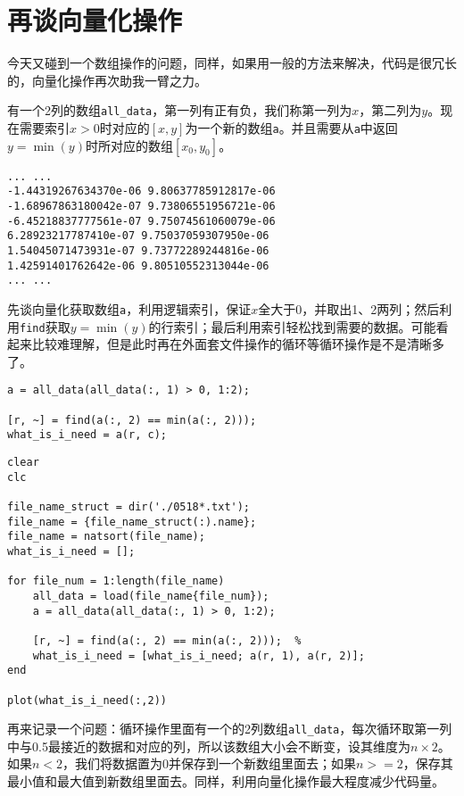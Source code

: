 \section{再谈向量化操作}

今天又碰到一个数组操作的问题，同样，如果用一般的方法来解决，代码是很冗长的，向量化操作再次助我一臂之力。

有一个2列的数组\texttt{all_data}，第一列有正有负，我们称第一列为$ x $，第二列为$ y $。现在需要索引$ x>0 $时对应的$ [x, y] $为一个新的数组\texttt{a}。并且需要从\texttt{a}中返回$ y=\min(y) $时所对应的数组$ [x_0, y_0] $。

\begin{verbatim}
... ...
-1.44319267634370e-06 9.80637785912817e-06
-1.68967863180042e-07 9.73806551956721e-06
-6.45218837777561e-07 9.75074561060079e-06
6.28923217787410e-07 9.75037059307950e-06
1.54045071473931e-07 9.73772289244816e-06
1.42591401762642e-06 9.80510552313044e-06
... ...
\end{verbatim}

先谈向量化获取数组\texttt{a}，利用逻辑索引，保证$ x $全大于0，并取出1、2两列；然后利用\texttt{find}获取$ y=\min(y) $的行索引；最后利用索引轻松找到需要的数据。可能看起来比较难理解，但是此时再在外面套文件操作的循环等循环操作是不是清晰多了。

\begin{verbatim}
a = all_data(all_data(:, 1) > 0, 1:2);

[r, ~] = find(a(:, 2) == min(a(:, 2)));
what_is_i_need = a(r, c);
\end{verbatim}

\begin{verbatim}
clear
clc

file_name_struct = dir('./0518*.txt');
file_name = {file_name_struct(:).name};
file_name = natsort(file_name);
what_is_i_need = [];

for file_num = 1:length(file_name)
    all_data = load(file_name{file_num});
    a = all_data(all_data(:, 1) > 0, 1:2);
    
    [r, ~] = find(a(:, 2) == min(a(:, 2)));  % 
    what_is_i_need = [what_is_i_need; a(r, 1), a(r, 2)];
end

plot(what_is_i_need(:,2))
\end{verbatim}

再来记录一个问题：循环操作里面有一个的2列数组\texttt{all_data}，每次循环取第一列中与0.5最接近的数据和对应的列，所以该数组大小会不断变，设其维度为$ n\times 2 $。如果$ n<2 $，我们将数据置为0并保存到一个新数组里面去；如果$ n>=2 $，保存其最小值和最大值到新数组里面去。同样，利用向量化操作最大程度减少代码量。

